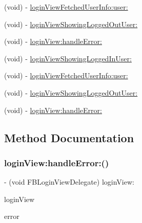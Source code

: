 \begin{DoxyCompactItemize}
(void) -\/ \hyperlink{protocolFBLoginViewDelegate_01-p_a6dfcb82e159aa83b726797ec2de6877c}{login\+View\+Fetched\+User\+Info\+:user\+:}
\item 
(void) -\/ \hyperlink{protocolFBLoginViewDelegate_01-p_a39d98ab433b5919a9e1e96388bbdc691}{login\+View\+Showing\+Logged\+Out\+User\+:}
\item 
(void) -\/ \hyperlink{protocolFBLoginViewDelegate_01-p_a4cc27024e9c1fac02fbc65fd6bfba993}{login\+View\+:handle\+Error\+:}
\item 
(void) -\/ \hyperlink{protocolFBLoginViewDelegate_01-p_a1f8604ad00171b432bdb0e4582856db9}{login\+View\+Showing\+Logged\+In\+User\+:}
\item 
(void) -\/ \hyperlink{protocolFBLoginViewDelegate_01-p_a6dfcb82e159aa83b726797ec2de6877c}{login\+View\+Fetched\+User\+Info\+:user\+:}
\item 
(void) -\/ \hyperlink{protocolFBLoginViewDelegate_01-p_a39d98ab433b5919a9e1e96388bbdc691}{login\+View\+Showing\+Logged\+Out\+User\+:}
\item 
(void) -\/ \hyperlink{protocolFBLoginViewDelegate_01-p_a4cc27024e9c1fac02fbc65fd6bfba993}{login\+View\+:handle\+Error\+:}
\end{DoxyCompactItemize}


\subsection{Method Documentation}
\mbox{\label{protocolFBLoginViewDelegate_01-p_a4cc27024e9c1fac02fbc65fd6bfba993}} 
\subsubsection{\texorpdfstring{login\+View\+:handle\+Error\+:()}{loginView:handleError:()}\hspace{0.1cm}{\footnotesize\ttfamily [1/5]}}
{\footnotesize\ttfamily -\/ (void F\+B\+Login\+View\+Delegate) login\+View\+: \begin{DoxyParamCaption}\item[{(\hyperlink{interfaceFBLoginView}{F\+B\+Login\+View} $\ast$)}]{login\+View }\item[{handleError:(N\+S\+Error $\ast$)}]{error }\end{DoxyParamCaption}\hspace{0.3cm}{\ttfamily [optional]}}

